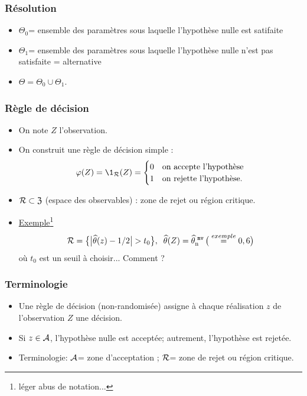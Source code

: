 \begin{frame}
\frametitle{Résolution}
\begin{itemize}
\item $\Theta_0$= ensemble des paramètres sous laquelle l'hypothèse nulle est satifaite
\item $\Theta_1$= ensemble des paramètres sous laquelle l'hypothèse nulle n'est pas satisfaite = \alert{alternative}
\item $\Theta= \Theta_0 \cup \Theta_1$.
\end{itemize}
\end{frame}

\begin{frame}
\frametitle{Règle de décision}
\begin{itemize}
\item On note $Z$ l'observation.
\item On \alert{construit} une \alert{règle de décision simple} :
$$\varphi(Z) = \1_{\zreject}(Z) =
\begin{cases}
0 & \text{on accepte l'hypothèse} \\
1 & \text{on rejette l'hypothèse.}
\end{cases}
$$
\item $ \mathcal{R}\subset {\mathfrak Z}$ (espace des observables) : \alert{zone de rejet} ou \alert{région critique}.
\item \underline{Exemple}\footnote{léger abus de notation...}
$$\mathcal{R} = \big\{\big|\widehat {\theta}(z)-1/2\big| > t_0\big\},\;\;\widehat {\theta}(Z) = \operatorname{\widehat \theta_n^{\,\,{\tt mv}}} \big(\stackrel{exemple}{=} 0,6\big)$$
où $t_0$ est un seuil à choisir... \alert{Comment ?}
\end{itemize}
\end{frame}

\begin{frame}
\frametitle{Terminologie}
\begin{itemize}
\item Une \alert{règle de décision} (non-randomisée) assigne à chaque réalisation $z$ de l'observation $Z$ une \alert{décision}.
\item Si $z \in \mathcal{A}$, l'hypothèse nulle est \alert{acceptée}; autrement, l'hypothèse est rejetée.
\item \alert{Terminologie}: $\mathcal{A}$= \alert{zone d'acceptation} ; $\mathcal{R}$= \alert{zone de rejet} ou \alert{région critique}.
\end{itemize}
\end{frame}

